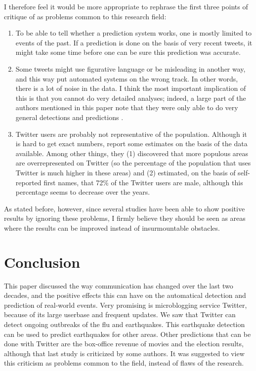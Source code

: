 \documentclass[12pt]{article}
\begin{document}
I therefore feel it would be more appropriate to rephrase the first three points of critique of  as problems common to this research field:

\begin{enumerate}
\item To be able to tell whether a prediction system works, one is mostly limited to events of the past. If a prediction is done on the basis of very recent tweets, it might take some time before one can be sure this prediction was accurate.
\item Some tweets might use figurative language or be misleading in another way, and this way put automated systems on the wrong track. In other words, there is a lot of noise in the data. I think the most important implication of this is that you cannot do very detailed analyses; indeed, a large part of the authors mentioned in this paper note that they were only able to do very general detections and predictions .
\item Twitter users are probably not representative of the population. Although it is hard to get exact numbers,  report some estimates on the basis of the data available. Among other things, they (1) discovered that more populous areas are overrepresented on Twitter (so the percentage of the population that uses Twitter is much higher in these areas) and (2) estimated, on the basis of self-reported first names, that 72\% of the Twitter users are male, although this percentage seems to decrease over the years.
\end{enumerate}

As stated before, however, since several studies have been able to show positive results by ignoring these problems, I firmly believe they should be seen as areas where the results can be improved instead of insurmountable obstacles.

\section{Conclusion} \label{conclusion}

This paper discussed the way communication has changed over the last two decades, and the positive effects this can have on the automatical detection and prediction of real-world events. Very promising is microblogging service Twitter, because of its large userbase and frequent updates. We saw that Twitter can detect ongoing outbreaks of the flu and earthquakes. This earthquake detection can be used to predict earthquakes for other areas. Other predictions that can be done with Twitter are the box-office revenue of movies and the election results, although that last study is criticized by some authors. It was suggested to view this criticism as problems common to the field, instead of flaws of the research.

{}

\end{document}
